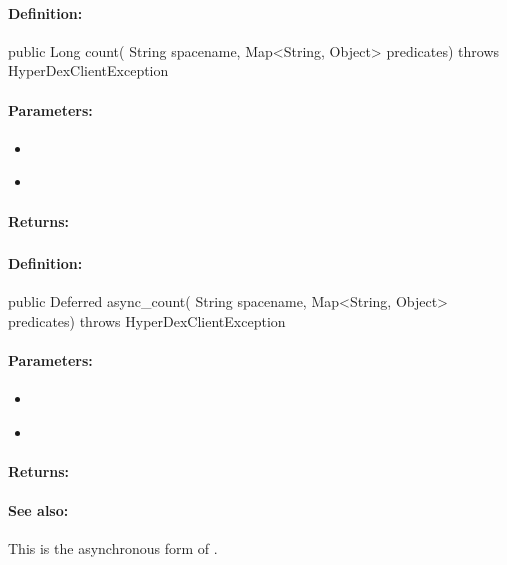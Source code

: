 \paragraph{Definition:}
\begin{javacode}
public Long count(
        String spacename,
        Map<String, Object> predicates) throws HyperDexClientException
\end{javacode}

\paragraph{Parameters:}
\begin{itemize}[noitemsep]
\item {}\\

\item {}\\

\end{itemize}

\paragraph{Returns:}


\pagebreak
\subsubsection{}
\label{api:java:async_count}


\paragraph{Definition:}
\begin{javacode}
public Deferred async_count(
        String spacename,
        Map<String, Object> predicates) throws HyperDexClientException
\end{javacode}

\paragraph{Parameters:}
\begin{itemize}[noitemsep]
\item {}\\

\item {}\\

\end{itemize}

\paragraph{Returns:}


\paragraph{See also:}  This is the asynchronous form of .
